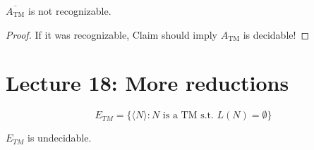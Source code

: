 \begin{corollary}
    $\overline{A_{\text{TM}}}$ is not recognizable.
\end{corollary}

\begin{proof}
    If it was recognizable, Claim should imply $A_{\text{TM}}$ is decidable!
\end{proof}

\section*{Lecture 18: More reductions}

\begin{equation*}
    E_{TM} = \{\langle N \rangle : N \text{ is a TM s.t. } L(N) = \emptyset\}
\end{equation*}

\begin{theorem}[Sipser 5.1]
    $E_{TM}$ is undecidable.
\end{theorem}

